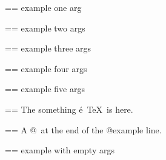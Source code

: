 \documentclass{book}
\makeatletter
\newenvironment{Texinfopreformatted}{%
  \par\GNUTobeylines\obeyspaces\frenchspacing\parskip=\z@\parindent=\z@}{}
{\catcode`\^^M=13 \gdef\GNUTobeylines{\catcode`\^^M=13 \def^^M{\null\par}}}
\newenvironment{Texinfoindented}{\begin{list}{}{}\item\relax}{\end{list}}
\renewcommand{\_}{\Texinfounderscore\discretionary{}{}{}}
\makeatother
\begin{document}
\begin{titlepage}
\begin{Texinfoindented}
\begin{Texinfopreformatted}%
\ttfamily example one arg
\end{Texinfopreformatted}
\end{Texinfoindented}

\begin{Texinfoindented}
\begin{Texinfopreformatted}%
\ttfamily example two args
\end{Texinfopreformatted}
\end{Texinfoindented}

\begin{Texinfoindented}
\begin{Texinfopreformatted}%
\ttfamily example three args
\end{Texinfopreformatted}
\end{Texinfoindented}

\begin{Texinfoindented}
\begin{Texinfopreformatted}%
\ttfamily example four args
\end{Texinfopreformatted}
\end{Texinfoindented}

\begin{Texinfoindented}
\begin{Texinfopreformatted}%
\ttfamily example five args
\end{Texinfopreformatted}
\end{Texinfoindented}

\begin{Texinfoindented}
\begin{Texinfopreformatted}%
\ttfamily The something \'{e}\ \TeX{}\ is here.
\end{Texinfopreformatted}
\end{Texinfoindented}

\begin{Texinfoindented}
\begin{Texinfopreformatted}%
\ttfamily A @\ at the end of the @example line.
\end{Texinfopreformatted}
\end{Texinfoindented}

\begin{Texinfoindented}
\begin{Texinfopreformatted}%
\ttfamily example with empty args
\end{Texinfopreformatted}
\end{Texinfoindented}


\end{titlepage}
\end{document}
